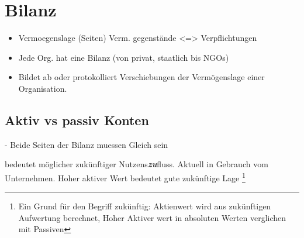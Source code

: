 \pagebreak
{}

\section{Bilanz}

\begin{itemize}
    \item Vermoegenslage (Seiten)
    \subitem Verm. gegenstände <=> Verpflichtungen
    \item  Jede Org. hat eine Bilanz (von privat, staatlich bis NGOs)
    \item Bildet ab oder protokolliert Verschiebungen der Vermögenslage einer Organisation.
\end{itemize}

\subsection{Aktiv vs passiv Konten}
- Beide Seiten der Bilanz muessen Gleich sein

\begin{definition}
     bedeutet möglicher zukünftiger Nutzens\textbf{\textit{zu}}fluss. Aktuell in Gebrauch vom Unternehmen. Hoher aktiver Wert bedeutet gute zukünftige Lage \footnote{Ein Grund für den Begriff zukünftig: Aktienwert wird aus zukünftigen Aufwertung berechnet, Hoher Aktiver wert in absoluten Werten verglichen mit Passiven}
\end{definition}


